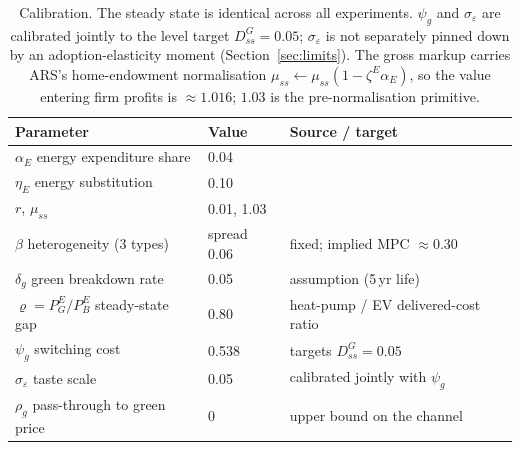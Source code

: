 \documentclass[11pt,a4paper]{article}
\begin{document}
\begin{table}[H]\centering
\small
\begin{tabular}{lll}
\toprule
Parameter & Value & Source / target \\
\midrule
$\alpha_E$ energy expenditure share & 0.04 & \citet{ARS2024} \\
$\eta_E$ energy substitution & 0.10 & \citet{ARS2024} \\
$r$, $\mu_{ss}$ & 0.01, 1.03 & \citet{ARS2024} \\
$\beta$ heterogeneity (3 types) & spread 0.06 & fixed; implied MPC $\approx0.30$ \\
\midrule
$\delta_g$ green breakdown rate & 0.05 & assumption (5\,yr life) \\
$\varrho=P^{E}_{G}/P^{E}_{B}$ steady-state gap & 0.80 & heat-pump / EV delivered-cost ratio \\
$\psi_g$ switching cost & 0.538 & targets $D^{G}_{ss}=0.05$ \\
$\sigma_{\varepsilon}$ taste scale & 0.05 & calibrated jointly with $\psi_g$ \\
$\rho_g$ pass-through to green price & 0 & upper bound on the channel \\
\bottomrule
\end{tabular}
\caption{Calibration. The steady state is identical across all experiments.
$\psi_g$ and $\sigma_\varepsilon$ are calibrated jointly to the level target
$D^{G}_{ss}=0.05$; $\sigma_\varepsilon$ is not separately pinned down by an
adoption-elasticity moment (Section~\ref{sec:limits}). The gross markup carries
ARS's home-endowment normalisation $\mu_{ss}\!\leftarrow\!\mu_{ss}(1-\zeta^E\alpha_E)$,
so the value entering firm profits is $\approx1.016$; $1.03$ is the
pre-normalisation primitive.}
\end{table}
\end{document}
